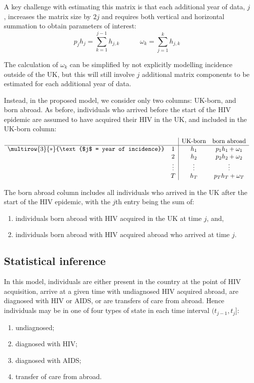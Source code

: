 \documentclass[11pt, a4paper]{article}
\begin{document}
A key challenge with estimating this matrix is that each additional year of data, $j$, increases the matrix size by $2j$ and requires both vertical and horizontal summation to obtain parameters of interest:
%
\[
    p_jh_j = \sum_{k=1}^{j-1} h_{j,k} \quad \quad \quad
    \omega_k = \sum_{j=1}^{k} h_{j,k}
\]

The calculation of $\omega_k$ can be simplified by not explicitly modelling incidence outside of the UK, but this will still involve $j$ additional matrix components to be estimated for each additional year of data.

Instead, in the proposed model, we consider only two columns: UK-born, and born abroad. As before, individuals who arrived before the start of the HIV epidemic are assumed to have acquired their HIV in the UK, and included in the UK-born column:
%
\[
\begin{array}{cc|cc}
& & \text{UK-born} & \text{born abroad} \\
\hline
\multirow{3}{*}{\text{$j$ = year of incidence}} & 1 & h_1 & p_1h_1 + \omega_1 \\
& 2 & h_2 & p_2h_2 + \omega_2 \\
& \vdots & \vdots & \vdots \\
& T & h_T & p_Th_T + \omega_T \\
\end{array}
\]

The born abroad column includes all individuals who arrived in the UK after the start of the HIV epidemic, with the $j$th entry being the sum of: 
%
\begin{enumerate}
    \item[$p_jh_j$:] individuals born abroad with HIV acquired in the UK at time $j$, and,
    \item[$\omega_j$:] individuals born abroad with HIV acquired abroad who arrived at time $j$.
\end{enumerate}

\subsection{Statistical inference}

In this model, individuals are either present in the country at the point of HIV acquisition, arrive at a given time with undiagnosed HIV acquired abroad, are diagnosed with HIV or AIDS, or are transfers of care from abroad.  Hence individuals may be in one of four types of state in each time interval $(t_{j-1}, t_j]$:
%
\begin{enumerate}
  \item undiagnosed;
  \item diagnosed with HIV;
  \item diagnosed with AIDS;
  \item transfer of care from abroad.
\end{enumerate}
\end{document}
